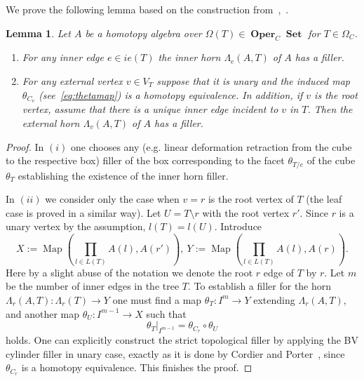 \documentclass{amsart}
\newtheorem{lemma}[formula]{Lemma}
\theoremstyle{definition}
\theoremstyle{remark}
\DeclareMathOperator{\Set}{\mathbf{Set}}
\DeclareMathOperator{\Oper}{\mathbf{Oper}}
\DeclareMathOperator{\Map}{Map}
\begin{document}
	We prove the following lemma based on the construction from~\cite{co-po-86},~\cite[Theorem 4.2]{ci-mo-11}.
	
	\begin{lemma}\label{lm:exthorn}
		Let $A$ be a homotopy algebra over $\Omega(T)\in\Oper_{C}\Set$ for $T\in \Omega_{C}$.
		\begin{enumerate}[label=(\roman*)]
			\item For any inner edge $e\in ie(T)$ the inner horn $\Lambda_{e}(A,T)$ of $A$ has a filler.
			\item For any external vertex $v\in V_{T}$ suppose that it is unary and the induced map $\theta_{C_{v}}$ (see~\eqref{eq:thetamap}) is a homotopy equivalence.
			In addition, if $v$ is the root vertex, assume that there is a unique inner edge incident to $v$ in $T$.
			Then the external horn $\Lambda_{v}(A,T)$ of $A$ has a filler.
		\end{enumerate}
	\end{lemma}
	\begin{proof}
		In $(i)$ one chooses any (e.g. linear deformation retraction from the cube to the respective box) filler of the box corresponding to the facet $\theta_{T/e}$ of the cube $\theta_{T}$ establishing the existence of the inner horn filler.
		
		In $(ii)$ we consider only the case when $v=r$ is the root vertex of $T$ (the leaf case is proved in a similar way).
		Let $U=T\setminus r$ with the root vertex $r'$.
		Since $r$ is a unary vertex by the assumption, $l(T)=l(U)$.
		Introduce
		\[
		X:=\Map(\prod_{l\in L(T)} A(l),A(r')),\ 
		Y:=\Map(\prod_{l\in L(T)} A(l),A(r)).
		\]
		Here by a slight abuse of the notation we denote the root $r$ edge of $T$ by $r$.
		Let $m$ be the number of inner edges in the tree $T$.
		To establish a filler for the horn $\Lambda_{r}(A,T)\colon \Lambda_{r}(T)\to Y$ one must find a map $\theta_{T}\colon I^{m}\to Y$ extending $\Lambda_{r}(A,T)$, and another map $\theta_{U}\colon I^{m-1}\to X$ such that 
		\begin{equation}\label{eq:homcomdec}
		\theta_{T}|_{I^{m-1}}=\theta_{C_{r}}\circ \theta_{U}
		\end{equation}
		holds.
		One can explicitly construct the strict topological filler by applying the BV cylinder filler in unary case, exactly as it is done by Cordier and Porter~\cite[Theorem~3.1]{co-po-86},
		since $\theta_{C_{r}}$ is a homotopy equivalence.
		This finishes the proof.
	\end{proof}
	
\end{document}
